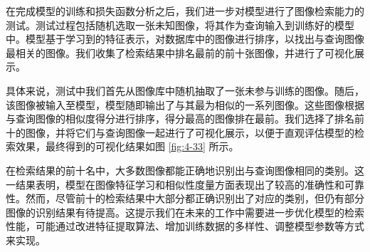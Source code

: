 在完成模型的训练和损失函数分析之后，我们进一步对模型进行了图像检索能力的测试。测试过程包括随机选取一张未知图像，将其作为查询输入到训练好的模型中。模型基于学习到的特征表示，对数据库中的图像进行排序，以找出与查询图像最相关的图像。我们收集了检索结果中排名最前的前十张图像，并进行了可视化展示。

具体来说，测试中我们首先从图像库中随机抽取了一张未参与训练的图像。随后，该图像被输入至模型，模型随即输出了与其最为相似的一系列图像。这些图像根据与查询图像的相似度得分进行排序，得分最高的图像排在最前。我们选择了排名前十的图像，并将它们与查询图像一起进行了可视化展示，以便于直观评估模型的检索效果，最终得到的可视化结果如图 \ref{fig:4-33} 所示。

在检索结果的前十名中，大多数图像都能正确地识别出与查询图像相同的类别。这一结果表明，模型在图像特征学习和相似性度量方面表现出了较高的准确性和可靠性。然而，尽管前十的检索结果中大部分都正确识别出了对应的类别，但仍有部分图像的识别结果有待提高。这提示我们在未来的工作中需要进一步优化模型的检索性能，可能通过改进特征提取算法、增加训练数据的多样性、调整模型参数等方式来实现。
























